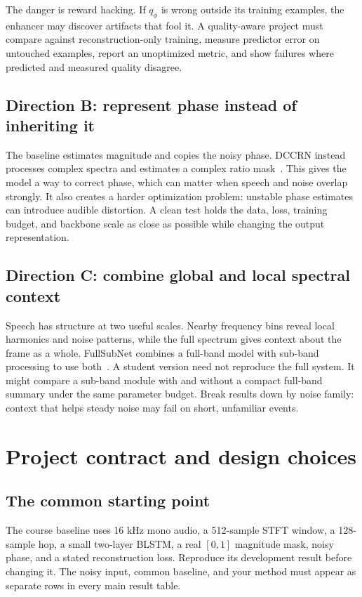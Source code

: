 \documentclass[11pt,letterpaper]{article}
\newcommand{\page}[1]{\clearpage\section{#1}}
\begin{document}
The danger is reward hacking. If $q_\phi$ is wrong outside its training examples, the enhancer may discover artifacts that fool it. A quality-aware project must compare against reconstruction-only training, measure predictor error on untouched examples, report an unoptimized metric, and show failures where predicted and measured quality disagree.

\subsection{Direction B: represent phase instead of inheriting it}
The baseline estimates magnitude and copies the noisy phase. DCCRN instead processes complex spectra and estimates a complex ratio mask~\cite{dccrn}. This gives the model a way to correct phase, which can matter when speech and noise overlap strongly. It also creates a harder optimization problem: unstable phase estimates can introduce audible distortion. A clean test holds the data, loss, training budget, and backbone scale as close as possible while changing the output representation.

\subsection{Direction C: combine global and local spectral context}
Speech has structure at two useful scales. Nearby frequency bins reveal local harmonics and noise patterns, while the full spectrum gives context about the frame as a whole. FullSubNet combines a full-band model with sub-band processing to use both~\cite{fullsubnet}. A student version need not reproduce the full system. It might compare a sub-band module with and without a compact full-band summary under the same parameter budget. Break results down by noise family: context that helps steady noise may fail on short, unfamiliar events.

\page{Project contract and design choices}
\small
\subsection{The common starting point}
The course baseline uses 16 kHz mono audio, a 512-sample STFT window, a 128-sample hop, a small two-layer BLSTM, a real $[0,1]$ magnitude mask, noisy phase, and a stated reconstruction loss. Reproduce its development result before changing it. The noisy input, common baseline, and your method must appear as separate rows in every main result table.
\end{document}

